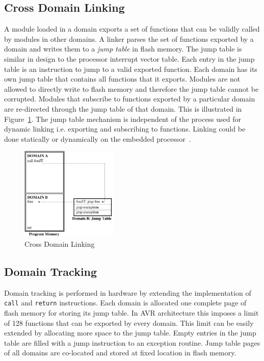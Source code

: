 \subsection{Cross Domain Linking}
%
A module loaded in a domain exports a set of functions that can be validly called by modules in other domains.
%
%
%
A linker parses the set of functions exported by a domain and writes them to a \textit{jump table} in flash memory.
%
The jump table is similar in design to the processor interrupt vector table.
%
Each entry in the jump table is an instruction to jump to a valid exported function.
%
Each domain has its own jump table that contains all functions that it exports. 
%
Modules are not allowed to directly write to flash memory and therefore the jump table cannot be corrupted.
%
Modules that subscribe to functions exported by a particular domain are re-directed through the jump table of that domain.
%
This is illustrated in Figure~\ref{fig:cross_domain_call}.
%
The jump table mechanism is independent of the process used for dynamic linking i.e. exporting and subscribing to functions.
%
Linking could be done statically or dynamically on the embedded processor~\cite{dunkels06linking}.
%
\begin{figure}[htbp]
   \centering
   \includegraphics[height=1.75in, keepaspectratio=true]{figures/cross_domain_call.pdf} 
   \caption{Cross Domain Linking}
   \label{fig:cross_domain_call}
\end{figure}
%
\subsection{Domain Tracking}
%
Domain tracking is performed in hardware by extending the implementation of \texttt{call} and \texttt{return} instructions.
%
Each domain is allocated one complete page of flash memory for storing its jump table.
%
In AVR architecture this imposes a limit of 128 functions that can be exported by every domain.
%
This limit can be easily extended by allocating more space to the jump table.
%
%
Empty entries in the jump table are filled with a jump instruction to an exception routine.
%
Jump table pages of all domains are co-located and stored at fixed location in flash memory.
%

